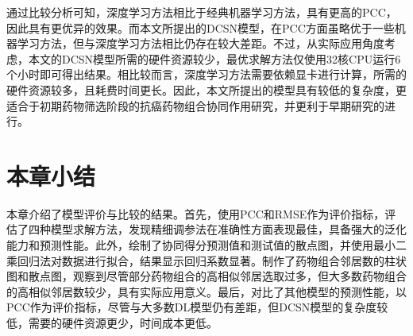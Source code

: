 通过比较分析可知，深度学习方法相比于经典机器学习方法，具有更高的PCC，因此具有更优异的效果。而本文所提出的DCSN模型，在PCC方面虽略优于一些机器学习方法，但与深度学习方法相比仍存在较大差距。不过，从实际应用角度考虑，本文的DCSN模型所需的硬件资源较少，最优求解方法仅使用32核CPU运行6个小时即可得出结果。相比较而言，深度学习方法需要依赖显卡进行计算，所需的硬件资源较多，且耗费时间更长。因此，本文所提出的模型具有较低的复杂度，更适合于初期药物筛选阶段的抗癌药物组合协同作用研究，并更利于早期研究的进行。

\section{本章小结}

本章介绍了模型评价与比较的结果。首先，使用PCC和RMSE作为评价指标，评估了四种模型求解方法，发现精细调参法在准确性方面表现最佳，具备强大的泛化能力和预测性能。此外，绘制了协同得分预测值和测试值的散点图，并使用最小二乘回归法对数据进行拟合，结果显示回归系数显著。制作了药物组合邻居数的柱状图和散点图，观察到尽管部分药物组合的高相似邻居选取过多，但大多数药物组合的高相似邻居数较少，具有实际应用意义。最后，对比了其他模型的预测性能，以PCC作为评价指标，尽管与大多数DL模型仍有差距，但DCSN模型的复杂度较低，需要的硬件资源更少，时间成本更低。